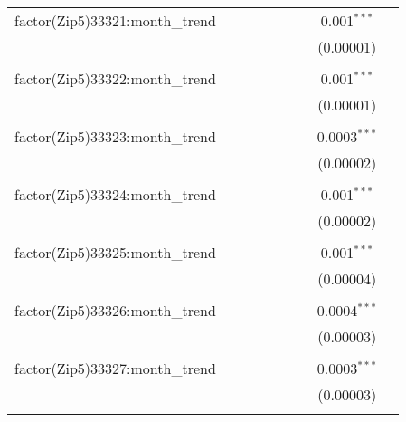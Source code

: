 \begin{table}[H]
{\begin{tabular}{@{\extracolsep{5pt}}lcccccccc}
  factor(Zip5)33321:month\_trend &  &  &  &  &  &  & 0.001$^{***}$ &  \\  

   &  &  &  &  &  &  & (0.00001) &  \\  

   & & & & & & & & \\  

  factor(Zip5)33322:month\_trend &  &  &  &  &  &  & 0.001$^{***}$ &  \\  

   &  &  &  &  &  &  & (0.00001) &  \\  

   & & & & & & & & \\  

  factor(Zip5)33323:month\_trend &  &  &  &  &  &  & 0.0003$^{***}$ &  \\  

   &  &  &  &  &  &  & (0.00002) &  \\  

   & & & & & & & & \\  

  factor(Zip5)33324:month\_trend &  &  &  &  &  &  & 0.001$^{***}$ &  \\  

   &  &  &  &  &  &  & (0.00002) &  \\  

   & & & & & & & & \\  

  factor(Zip5)33325:month\_trend &  &  &  &  &  &  & 0.001$^{***}$ &  \\  

   &  &  &  &  &  &  & (0.00004) &  \\  

   & & & & & & & & \\  

  factor(Zip5)33326:month\_trend &  &  &  &  &  &  & 0.0004$^{***}$ &  \\  

   &  &  &  &  &  &  & (0.00003) &  \\  

   & & & & & & & & \\  

  factor(Zip5)33327:month\_trend &  &  &  &  &  &  & 0.0003$^{***}$ &  \\  

   &  &  &  &  &  &  & (0.00003) &  \\  

   & & & & & & & & \\  


\end{tabular}}
\end{table}
